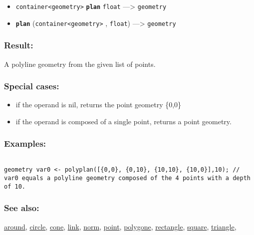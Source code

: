 \documentclass[]{book}
\providecommand{\tightlist}{%
  \setlength{\itemsep}{0pt}\setlength{\parskip}{0pt}}
\theoremstyle{definition}
\theoremstyle{definition}
\theoremstyle{definition}
\theoremstyle{remark}
\begin{document}
\begin{itemize}
\tightlist
\item
  \texttt{container\textless{}geometry\textgreater{}}
  \textbf{\texttt{plan}} \texttt{float} ---\textgreater{}
  \texttt{geometry}
\item
  \textbf{\texttt{plan}}
  (\texttt{container\textless{}geometry\textgreater{}} , \texttt{float})
  ---\textgreater{} \texttt{geometry}
\end{itemize}

\subsubsection{Result:}\label{result-386}

A polyline geometry from the given list of points.

\subsubsection{Special cases:}\label{special-cases-110}

\begin{itemize}
\tightlist
\item
  if the operand is nil, returns the point geometry \{0,0\}\\
\item
  if the operand is composed of a single point, returns a point
  geometry.
\end{itemize}

\subsubsection{Examples:}\label{examples-275}

\begin{verbatim}
 
geometry var0 <- polyplan([{0,0}, {0,10}, {10,10}, {10,0}],10); // var0 equals a polyline geometry composed of the 4 points with a depth of 10.
\end{verbatim}

\subsubsection{See also:}\label{see-also-161}

\href{OperatorsAA\#around}{around}, \href{OperatorsBC\#circle}{circle},
\href{OperatorsBC\#cone}{cone}, \href{OperatorsIM\#link}{link},
\href{OperatorsNR\#norm}{norm}, \href{OperatorsNR\#point}{point},
\href{OperatorsSZ\#polygone}{polygone},
\href{OperatorsNR\#rectangle}{rectangle},
\href{OperatorsSZ\#square}{square},
\href{OperatorsSZ\#triangle}{triangle},
\end{document}
